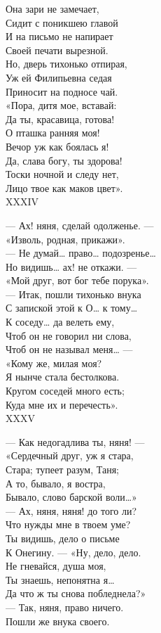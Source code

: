 {Она зари не замечает,\\
Сидит с поникшею главой\\
И на письмо не напирает\\
Своей печати вырезной.\\
Но, дверь тихонько отпирая,\\
Уж ей Филипьевна седая\\
Приносит на подносе чай.\\
«Пора, дитя мое, вставай:\\
Да ты, красавица, готова!\\
О пташка ранняя моя!\\
Вечор уж как боялась я!\\
Да, слава богу, ты здорова!\\
Тоски ночной и следу нет,\\
Лицо твое как маков цвет».\\

XXXIV

— Ах! няня, сделай одолженье. —\\
«Изволь, родная, прикажи».\\
— Не думай… право… подозренье…\\
Но видишь… ах! не откажи. —\\
«Мой друг, вот бог тебе порука».\\
— Итак, пошли тихонько внука\\
С запиской этой к О… к тому…\\
К соседу… да велеть ему,\\
Чтоб он не говорил ни слова,\\
Чтоб он не называл меня… —\\
«Кому же, милая моя?\\
Я нынче стала бестолкова.\\
Кругом соседей много есть;\\
Куда мне их и перечесть».\\

XXXV

— Как недогадлива ты, няня! —\\
«Сердечный друг, уж я стара,\\
Стара; тупеет разум, Таня;\\
А то, бывало, я востра,\\
Бывало, слово барской воли…»\\
— Ах, няня, няня! до того ли?\\
Что нужды мне в твоем уме?\\
Ты видишь, дело о письме\\
К Онегину. — «Ну, дело, дело.\\
Не гневайся, душа моя,\\
Ты знаешь, непонятна я…\\
Да что ж ты снова побледнела?»\\
— Так, няня, право ничего.\\
Пошли же внука своего.\\

}

